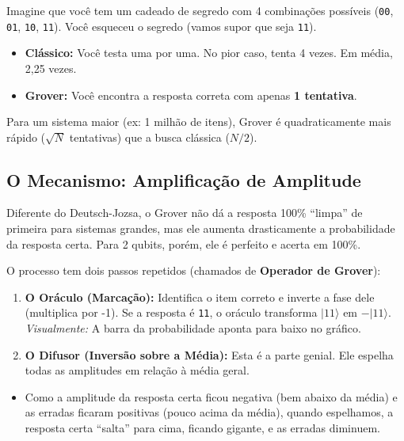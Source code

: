 \documentclass[
  brazilian,
]{report}
\providecommand{\tightlist}{%
  \setlength{\itemsep}{0pt}\setlength{\parskip}{0pt}}
\begin{document}
Imagine que você tem um cadeado de segredo com 4 combinações possíveis
(\texttt{00}, \texttt{01}, \texttt{10}, \texttt{11}). Você esqueceu o
segredo (vamos supor que seja \texttt{11}).

\begin{itemize}
\tightlist
\item
  \textbf{Clássico:} Você testa uma por uma. No pior caso, tenta 4
  vezes. Em média, 2,25 vezes.
\item
  \textbf{Grover:} Você encontra a resposta correta com apenas \textbf{1
  tentativa}.
\end{itemize}

Para um sistema maior (ex: 1 milhão de itens), Grover é quadraticamente
mais rápido (\(\sqrt{N}\) tentativas) que a busca clássica (\(N/2\)).

\subsection{O Mecanismo: Amplificação de
Amplitude}\label{o-mecanismo-amplificauxe7uxe3o-de-amplitude}

Diferente do Deutsch-Jozsa, o Grover não dá a resposta 100\% ``limpa''
de primeira para sistemas grandes, mas ele aumenta drasticamente a
probabilidade da resposta certa. Para 2 qubits, porém, ele é perfeito e
acerta em 100\%.

O processo tem dois passos repetidos (chamados de \textbf{Operador de
Grover}):

\begin{enumerate}
\def\labelenumi{\arabic{enumi}.}
\tightlist
\item
  \textbf{O Oráculo (Marcação):} Identifica o item correto e inverte a
  fase dele (multiplica por -1). Se a resposta é \texttt{11}, o oráculo
  transforma \(|11\rangle\) em \(-|11\rangle\). \emph{Visualmente:} A
  barra da probabilidade aponta para baixo no gráfico.
\item
  \textbf{O Difusor (Inversão sobre a Média):} Esta é a parte genial.
  Ele espelha todas as amplitudes em relação à média geral.
\end{enumerate}

\begin{itemize}
\tightlist
\item
  Como a amplitude da resposta certa ficou negativa (bem abaixo da
  média) e as erradas ficaram positivas (pouco acima da média), quando
  espelhamos, a resposta certa ``salta'' para cima, ficando gigante, e
  as erradas diminuem.
\end{itemize}
\end{document}
